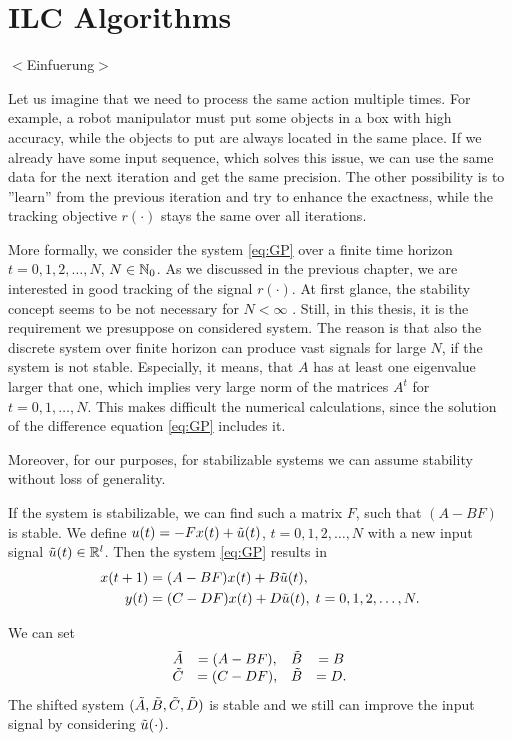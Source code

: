 \chapter{ILC Algorithms}
\label{ch:ILCAlg}
{\color{red} $<$Einfuerung$>$}


Let us imagine that we need to process the same action multiple times. 
For example, a robot manipulator must put some objects in a box with high accuracy, while the objects to put are always located in the same place. If we already have some input sequence, which solves this issue, we can use the same data for the next iteration and get the same precision. The other possibility is to ''learn'' from the previous iteration and try to enhance the exactness, while the tracking objective $r(\cdot)$ stays the same over all iterations.

More formally, we consider the system \eqref{eq:GP} over a finite time horizon $t = 0, 1, 2, \dots, N$, $N \in {\mathbb{N}}_0$. As we discussed in the previous chapter, we are interested in good tracking of the signal $r(\cdot)$. At first glance, the stability concept seems to be not necessary for $N < \infty$ . Still, in this thesis, it is the requirement we presuppose on considered system. The reason is that also the discrete system over finite horizon can produce vast signals for large $N$, if the system is not stable. Especially, it means, that $A$ has at least one eigenvalue larger that one, which implies very large norm of the matrices $A^t$ for $t = 0, 1, \dots, N$. This makes difficult the numerical calculations, since the solution of the difference equation \eqref{eq:GP} includes it. 

Moreover, for our purposes, for stabilizable systems we can assume stability without loss of generality. 

If the system is stabilizable, we can find such a matrix $F$, such that $(A - B F )$ is stable. 
We define $u(t) = - Fx(t) + \tilde{u}(t)$, $t = 0,1,2, \dots, N$ with a new input signal $\tilde{u} (t) \in {\mathbb{R}}^l$. Then the system \eqref{eq:GP} results in
\begin{align}
\begin{split}
x(t+1) &= (A - B F)x(t) + B \tilde{u} (t), \\
y(t)   &= (C - D F) x(t) + D\tilde{u}(t), \; t = 0, 1 ,2, \dots, N. 
\end{split}
\end{align}

We can set 
\begin{align}
\begin{array}{c c c c}
\tilde{A} &= (A - B F), &\tilde{B} &= B\\
\tilde{C}  & = (C - D F),&\tilde{B} & = D.
\end{array}
\end{align}
The shifted system $(\tilde{A}, \tilde{B} , \tilde{C}, \tilde{D})$ is stable and we still can improve the input signal by considering $\tilde{u}(\cdot)$.

